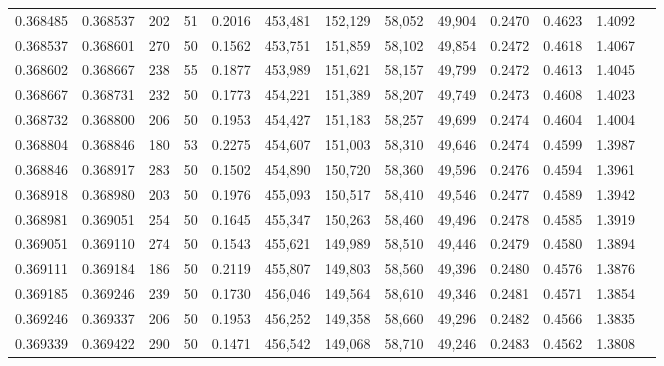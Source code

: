 \begin{tabular}{rrrrrrrrrrrrr}
0.368485 & 0.368537 &   202 &  51 &                                     0.2016 & 453,481 & 152,129 &  58,052 &  49,904 & 0.2470 & 0.4623 & 1.4092 \\
0.368537 & 0.368601 &   270 &  50 &                                     0.1562 & 453,751 & 151,859 &  58,102 &  49,854 & 0.2472 & 0.4618 & 1.4067 \\
0.368602 & 0.368667 &   238 &  55 &                                     0.1877 & 453,989 & 151,621 &  58,157 &  49,799 & 0.2472 & 0.4613 & 1.4045 \\
0.368667 & 0.368731 &   232 &  50 &                                     0.1773 & 454,221 & 151,389 &  58,207 &  49,749 & 0.2473 & 0.4608 & 1.4023 \\
0.368732 & 0.368800 &   206 &  50 &                                     0.1953 & 454,427 & 151,183 &  58,257 &  49,699 & 0.2474 & 0.4604 & 1.4004 \\
0.368804 & 0.368846 &   180 &  53 &                                     0.2275 & 454,607 & 151,003 &  58,310 &  49,646 & 0.2474 & 0.4599 & 1.3987 \\
0.368846 & 0.368917 &   283 &  50 &                                     0.1502 & 454,890 & 150,720 &  58,360 &  49,596 & 0.2476 & 0.4594 & 1.3961 \\
0.368918 & 0.368980 &   203 &  50 &                                     0.1976 & 455,093 & 150,517 &  58,410 &  49,546 & 0.2477 & 0.4589 & 1.3942 \\
0.368981 & 0.369051 &   254 &  50 &                                     0.1645 & 455,347 & 150,263 &  58,460 &  49,496 & 0.2478 & 0.4585 & 1.3919 \\
0.369051 & 0.369110 &   274 &  50 &                                     0.1543 & 455,621 & 149,989 &  58,510 &  49,446 & 0.2479 & 0.4580 & 1.3894 \\
0.369111 & 0.369184 &   186 &  50 &                                     0.2119 & 455,807 & 149,803 &  58,560 &  49,396 & 0.2480 & 0.4576 & 1.3876 \\
0.369185 & 0.369246 &   239 &  50 &                                     0.1730 & 456,046 & 149,564 &  58,610 &  49,346 & 0.2481 & 0.4571 & 1.3854 \\
0.369246 & 0.369337 &   206 &  50 &                                     0.1953 & 456,252 & 149,358 &  58,660 &  49,296 & 0.2482 & 0.4566 & 1.3835 \\
0.369339 & 0.369422 &   290 &  50 &                                     0.1471 & 456,542 & 149,068 &  58,710 &  49,246 & 0.2483 & 0.4562 & 1.3808 \\

\end{tabular}
